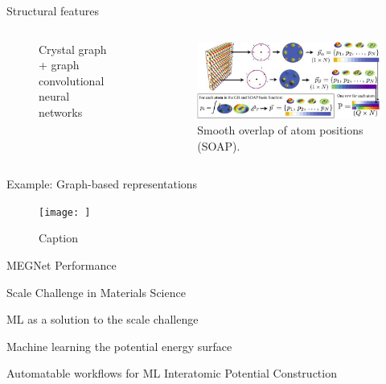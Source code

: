 \documentclass[aspectratio=169]{beamer}
\begin{document}
\begin{frame}{Structural features}
\begin{columns}
\begin{figure}
            \caption{Crystal graph + graph convolutional neural networks}
        \end{figure}
        \begin{figure}
            \centering
            \includegraphics[width=\textwidth]{lectures/slides_tex/figures/soap.png}
            \caption{Smooth overlap of atom positions (SOAP).\cite{rosenbrockDiscoveringBuildingBlocks2017}}
        \end{figure}
    \end{columns}
\end{frame}


\begin{frame}{Example: Graph-based representations}
    \begin{figure}
        \centering
        \texttt{[image: ]}
        \caption{Caption}
        \label{fig:my_label}
    \end{figure}
\end{frame}


\begin{frame}{MEGNet Performance}
    
\end{frame}


\begin{frame}{Scale Challenge in Materials Science}
    
\end{frame}


\begin{frame}{ML as a solution to the scale challenge}
    
\end{frame}


\begin{frame}{Machine learning the potential energy surface}
    
\end{frame}


\begin{frame}{Automatable workflows for ML Interatomic Potential Construction}
    
\end{frame}
\end{document}

